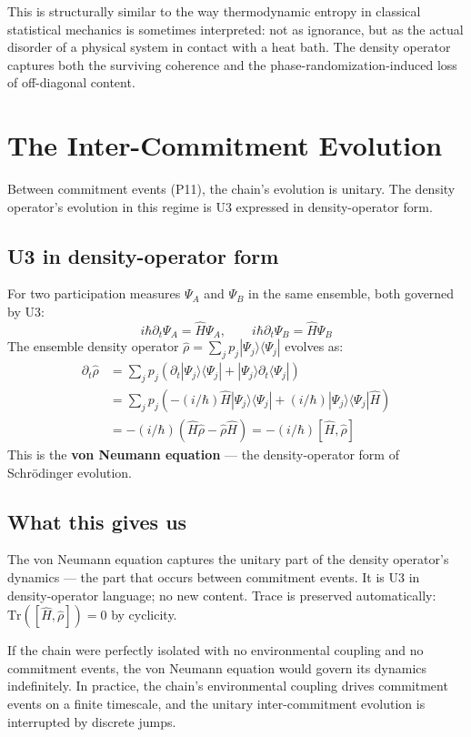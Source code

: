 \documentclass[11pt,a4paper]{article}
\begin{document}
This is structurally similar to the way thermodynamic entropy in classical statistical mechanics is sometimes interpreted: not as ignorance, but as the actual disorder of a physical system in contact with a heat bath. The density operator captures both the surviving coherence and the phase-randomization-induced loss of off-diagonal content.

\section{The Inter-Commitment Evolution}

Between commitment events (P11), the chain's evolution is unitary. The density operator's evolution in this regime is U3 expressed in density-operator form.

\subsection{U3 in density-operator form}

For two participation measures $\Psi_A$ and $\Psi_B$ in the same ensemble, both governed by U3:
\[
i\hbar\partial_t\Psi_A = \hat H \Psi_A, \qquad i\hbar\partial_t\Psi_B = \hat H \Psi_B
\]
The ensemble density operator $\hat\rho = \sum_j p_j |\Psi_j\rangle\langle\Psi_j|$ evolves as:
\begin{align*}
\partial_t\hat\rho &= \sum_j p_j (\partial_t|\Psi_j\rangle\langle\Psi_j| + |\Psi_j\rangle\partial_t\langle\Psi_j|) \\
&= \sum_j p_j (-(i/\hbar)\hat H|\Psi_j\rangle\langle\Psi_j| + (i/\hbar)|\Psi_j\rangle\langle\Psi_j|\hat H) \\
&= -(i/\hbar)(\hat H\hat\rho - \hat\rho\hat H) = -(i/\hbar)[\hat H, \hat\rho]
\end{align*}
This is the \textbf{von Neumann equation} --- the density-operator form of Schr\"odinger evolution.

\subsection{What this gives us}

The von Neumann equation captures the unitary part of the density operator's dynamics --- the part that occurs between commitment events. It is U3 in density-operator language; no new content. Trace is preserved automatically: $\mathrm{Tr}([\hat H, \hat\rho]) = 0$ by cyclicity.

If the chain were perfectly isolated with no environmental coupling and no commitment events, the von Neumann equation would govern its dynamics indefinitely. In practice, the chain's environmental coupling drives commitment events on a finite timescale, and the unitary inter-commitment evolution is interrupted by discrete jumps.
\end{document}
